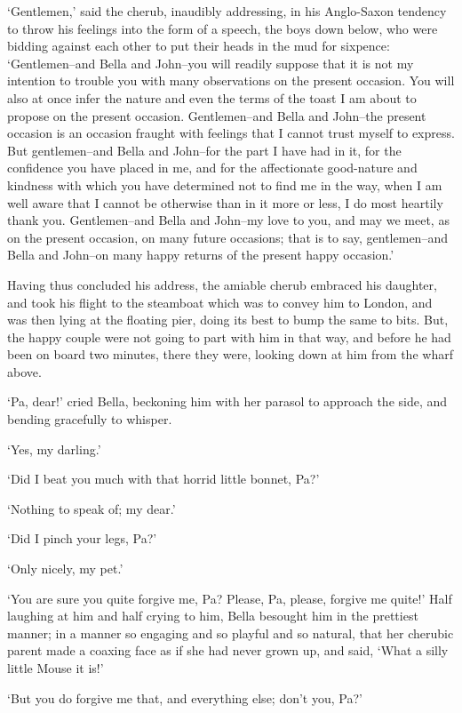 ‘Gentlemen,’ said the cherub, inaudibly addressing, in his Anglo-Saxon
tendency to throw his feelings into the form of a speech, the boys down
below, who were bidding against each other to put their heads in the mud
for sixpence: ‘Gentlemen--and Bella and John--you will readily suppose
that it is not my intention to trouble you with many observations on the
present occasion. You will also at once infer the nature and even
the terms of the toast I am about to propose on the present occasion.
Gentlemen--and Bella and John--the present occasion is an occasion
fraught with feelings that I cannot trust myself to express. But
gentlemen--and Bella and John--for the part I have had in it, for the
confidence you have placed in me, and for the affectionate good-nature
and kindness with which you have determined not to find me in the way,
when I am well aware that I cannot be otherwise than in it more or less,
I do most heartily thank you. Gentlemen--and Bella and John--my love
to you, and may we meet, as on the present occasion, on many future
occasions; that is to say, gentlemen--and Bella and John--on many happy
returns of the present happy occasion.’

Having thus concluded his address, the amiable cherub embraced his
daughter, and took his flight to the steamboat which was to convey him
to London, and was then lying at the floating pier, doing its best to
bump the same to bits. But, the happy couple were not going to part with
him in that way, and before he had been on board two minutes, there they
were, looking down at him from the wharf above.

‘Pa, dear!’ cried Bella, beckoning him with her parasol to approach the
side, and bending gracefully to whisper.

‘Yes, my darling.’

‘Did I beat you much with that horrid little bonnet, Pa?’

‘Nothing to speak of; my dear.’

‘Did I pinch your legs, Pa?’

‘Only nicely, my pet.’

‘You are sure you quite forgive me, Pa? Please, Pa, please, forgive me
quite!’ Half laughing at him and half crying to him, Bella besought him
in the prettiest manner; in a manner so engaging and so playful and
so natural, that her cherubic parent made a coaxing face as if she had
never grown up, and said, ‘What a silly little Mouse it is!’

‘But you do forgive me that, and everything else; don’t you, Pa?’


